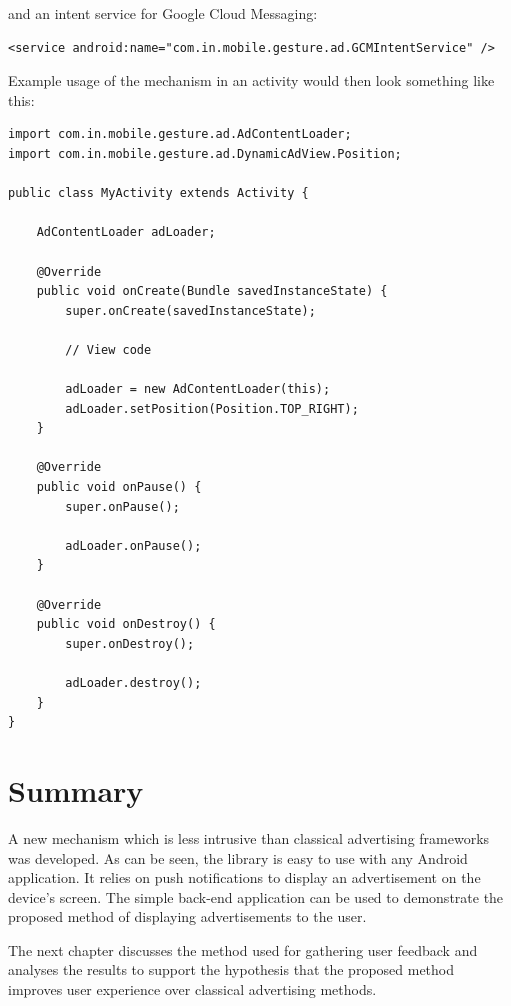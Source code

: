 and an intent service for Google Cloud Messaging:

\begin{lstlisting}
<service android:name="com.in.mobile.gesture.ad.GCMIntentService" />
\end{lstlisting}

Example usage of the mechanism in an activity would then look something like this:

\lstset{language=Java}

\begin{lstlisting}
import com.in.mobile.gesture.ad.AdContentLoader;
import com.in.mobile.gesture.ad.DynamicAdView.Position;

public class MyActivity extends Activity {

    AdContentLoader adLoader;

    @Override
    public void onCreate(Bundle savedInstanceState) {
        super.onCreate(savedInstanceState);

        // View code

        adLoader = new AdContentLoader(this);
        adLoader.setPosition(Position.TOP_RIGHT);
    }

    @Override
    public void onPause() {
        super.onPause();

        adLoader.onPause();
    }

    @Override
    public void onDestroy() {
        super.onDestroy();

        adLoader.destroy();
    }
}
\end{lstlisting}

\section{Summary}

A new mechanism which is less intrusive than classical advertising frameworks was developed. As can be seen, the library is easy to use with any Android application. It relies on push notifications to display an advertisement on the device's screen. The simple back-end application can be used to demonstrate the proposed method of displaying advertisements to the user.

The next chapter discusses the method used for gathering user feedback and analyses the results to support the hypothesis that the proposed method improves user experience over classical advertising methods.